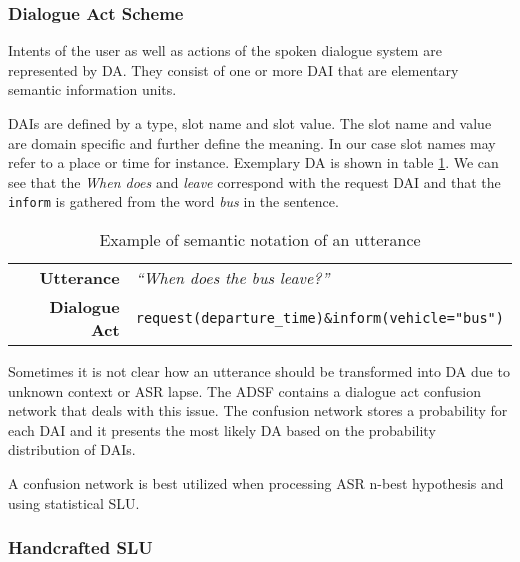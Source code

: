 \subsubsection{Dialogue Act Scheme}

Intents of the user as well as actions of the spoken dialogue system are represented by \acf{DA}.
They consist of one or more \acf{DAI} that are elementary semantic information units.

\acp{DAI} are defined by a type, slot name and slot value.
The slot name and value are domain specific and further define the meaning.
In our case slot names may refer to a place or time for instance.
Exemplary \ac{DA} is shown in table \ref{table:utterance}.
We can see that the \textit{When does} and \textit{leave} correspond with the request \ac{DAI} and that the \texttt{inform} is gathered from the word \textit{bus} in the sentence.

\begin{table}[h]
\centering
\begin{tabular}{ r | l }
	\textbf{Utterance} & \textit{``When does the bus leave?''} \\
	\textbf{Dialogue Act} & \texttt{request(departure\_time)\&inform(vehicle="bus")}
\end{tabular}
\caption[Semantic notation of an utterance]{Example of semantic notation of an utterance}
\label{table:utterance}
\end{table}

Sometimes it is not clear how an utterance should be transformed into \ac{DA} due to unknown context or \ac{ASR} lapse.
The \ac{ADSF} contains a dialogue act confusion network that deals with this issue. %
The confusion network stores a probability for each \ac{DAI} and it presents the most likely \ac{DA} based on the probability distribution of \acp{DAI}.

A confusion network is best utilized when processing \ac{ASR} n-best hypothesis and using statistical \ac{SLU}.

\subsubsection{Handcrafted \ac{SLU}}

